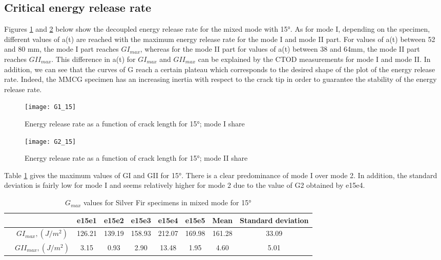\subsection{Critical energy release rate}

Figures \ref{fig:G1_15} and \ref{fig:G2_15} below show the decoupled energy release rate for the mixed mode with 15°.
As for mode I, depending on the specimen, different values of a(t) are reached with the maximum energy release rate for the mode I and mode II part. For values of a(t) between 52 and 80 mm, the mode I part reaches $GI_{max}$, whereas for the mode II part for values of a(t) between 38 and 64mm, the mode II part reaches $GII_{max}$. This difference in a(t) for $GI_{max}$ and $GII_{max}$ can be explained by the CTOD measurements for mode I and mode II.
In addition, we can see that the curves of G reach a certain plateau which corresponds to the desired shape of the plot of the energy release rate. Indeed, the MMCG specimen has an increasing inertia with respect to the crack tip in order to guarantee the stability of the energy release rate.

\begin{figure}[htp]
	\centering
	\texttt{[image: G1\_15]}
	\caption{Energy release rate as a function of crack length for 15°; mode I share}
	\label{fig:G1_15}
\end{figure}

\begin{figure}[htp]
	\centering
	\texttt{[image: G2\_15]}
	\caption{Energy release rate as a function of crack length for 15°; mode II share}
	\label{fig:G2_15}
\end{figure}

Table \ref{fig:tableG15} gives the maximum values of GI and GII for 15°. There is a clear predominance of mode I over mode 2. In addition, the standard deviation is fairly low for mode I and seems relatively higher for mode 2 due to the value of G2 obtained by e15e4.

\begin{table} [H]
	\centering
	\begin{tabular}{ccccccccc}
		\toprule %
		&  & e15e1 & e15e2 & e15e3 & e15e4 & e15e5 & Mean & Standard deviation\\\midrule
		& $GI_{max}, (J/m^2)$ & 126.21 & 139.19 & 158.93 & 212.07 & 169.98 & 161.28 & 33.09 \\\midrule
		& $GII_{max}, (J/m^2)$ & 3.15 & 0.93 & 2.90 & 13.48 & 1.95 & 4.60 & 5.01\\\midrule
	\end{tabular}
	\caption{$G_{max}$ values for Silver Fir specimens in mixed mode for 15°}
	\label{fig:tableG15}
\end{table}

